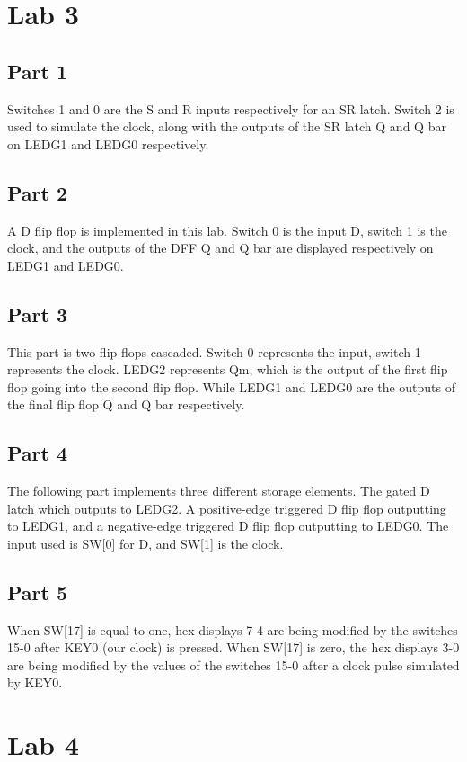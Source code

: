\documentclass[oneside,letterpaper,12pt,titlepage]{article}
\begin{document}
\section{Lab 3}

\subsection{Part 1}
Switches 1 and 0 are the S and R inputs respectively for an SR latch. Switch 2 is used to simulate the clock, along with the outputs of the SR latch Q and Q bar on LEDG1 and LEDG0 respectively.

\subsection{Part 2}
A D flip flop is implemented in this lab. Switch 0 is the input D, switch 1 is the clock, and the outputs of the DFF Q and Q bar are displayed respectively on LEDG1 and LEDG0.

\subsection{Part 3}
This part is two flip flops cascaded. Switch 0 represents the input, switch 1 represents the clock. LEDG2 represents Qm, which is the output of the first flip flop going into the second flip flop. While LEDG1 and LEDG0 are the outputs of the final flip flop Q and Q bar respectively.

\subsection{Part 4}
The following part implements three different storage elements. The gated D latch which outputs to LEDG2. A positive-edge triggered D flip flop outputting to LEDG1, and a negative-edge triggered D flip flop outputting to LEDG0. The input used is SW[0] for D, and SW[1] is the clock.

\subsection{Part 5}
When SW[17] is equal to one, hex displays 7-4 are being modified by the switches 15-0 after KEY0 (our clock) is pressed. When SW[17] is zero, the hex displays 3-0 are being modified by the values of the switches 15-0 after a clock pulse simulated by KEY0.

\section{Lab 4}
\end{document}

